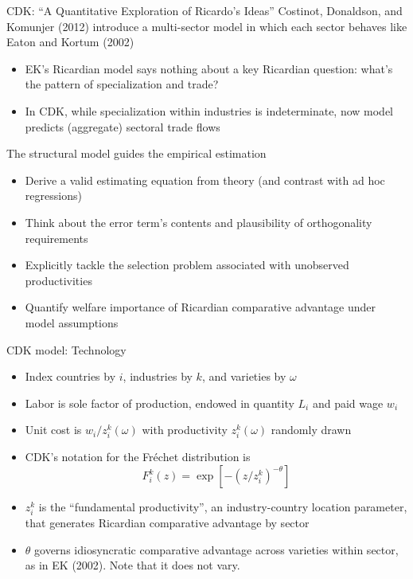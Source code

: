 \documentclass[10pt,notes=hide]{beamer}
\begin{document}
\begin{frame}{CDK: ``A Quantitative Exploration of Ricardo's Ideas''}
Costinot, Donaldson, and Komunjer (2012) introduce a multi-sector model in which each sector behaves like Eaton and Kortum (2002)
\begin{itemize}
	\item EK's Ricardian model says nothing about a key Ricardian question: what's the pattern of specialization and trade?
	\item In CDK, while specialization within industries is indeterminate, now model predicts (aggregate) sectoral trade flows
\end{itemize}
The structural model guides the empirical estimation
\begin{itemize}
	\item Derive a valid estimating equation from theory (and contrast with ad hoc regressions)
	\item Think about the error term's contents and plausibility of orthogonality requirements
	\item Explicitly tackle the selection problem associated with unobserved productivities
	\item Quantify welfare importance of Ricardian comparative advantage under model assumptions
\end{itemize}
\end{frame}
\begin{frame}{CDK model: Technology}
\begin{itemize}
	\item Index countries by $i$, industries by $k$, and varieties by $\omega$
	\item Labor is sole factor of production, endowed in quantity $L_i$ and paid wage $w_i$
	\item Unit cost is $w_i/z_i^k(\omega)$ with productivity $z_i^k(\omega)$ randomly drawn
	\item CDK's notation for the Fr\'{e}chet distribution is
	\begin{equation*}
		F_i^k(z) = \exp\left[-\left(z/z_i^k\right)^{-\theta}\right]
	\end{equation*}
	\item $z_i^k$ is the ``fundamental productivity'', an industry-country location parameter, that generates Ricardian comparative advantage by sector
	\item $\theta$ governs idiosyncratic comparative advantage across varieties within sector, as in EK (2002). Note that it does not vary.
\end{itemize}
\end{frame}
\end{document}
